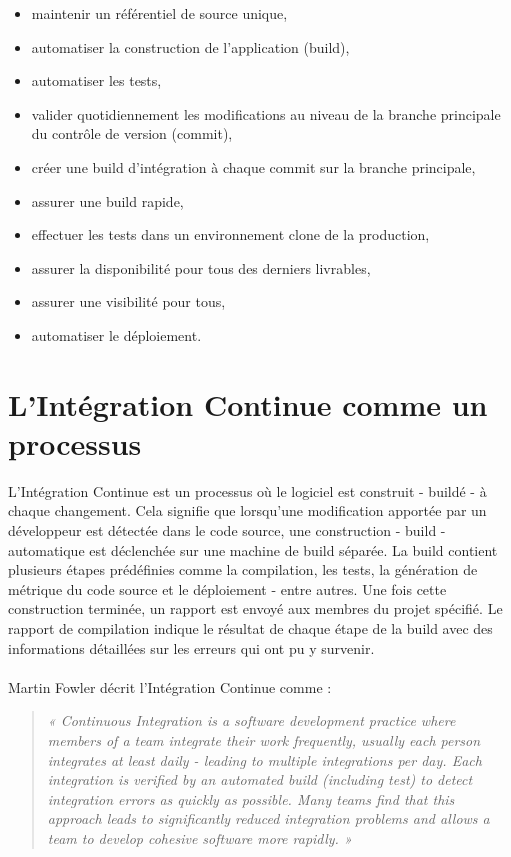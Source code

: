   \begin{itemize}
    \item maintenir un référentiel de source unique,
    \item automatiser la construction de l’application (build),
    \item automatiser les tests,
    \item valider quotidiennement les modifications au niveau de la branche principale du contrôle de version (commit),
    \item créer une build d’intégration à chaque commit sur la branche principale,
    \item assurer une build rapide,
    \item effectuer les tests dans un environnement clone de la production,
    \item assurer la disponibilité pour tous des derniers livrables,
    \item assurer une visibilité pour tous,
    \item automatiser le déploiement.\\
  \end{itemize}

  \section{L'Intégration Continue comme un processus}
  L’Intégration Continue est un processus où le logiciel est construit - buildé - à chaque changement. Cela signifie que lorsqu’une modification apportée par un développeur est détectée dans le code source, une construction - build - automatique est déclenchée sur une machine de build séparée. La build contient plusieurs étapes prédéfinies comme la compilation, les tests, la génération de métrique du code source et le déploiement - entre autres. Une fois cette construction terminée, un rapport est envoyé aux membres du projet spécifié. Le rapport de compilation indique le résultat de chaque étape de la build avec des informations détaillées sur les erreurs qui ont pu y survenir.\\\\

  Martin Fowler \cite{Fow00} décrit l’Intégration Continue comme :\\
  \begin{quotation}
    \emph{« Continuous Integration is a software development practice where members of a team integrate their work frequently, usually each person integrates at least daily - leading to multiple integrations per day. Each integration is verified by an automated build (including test) to detect integration errors as quickly as possible. Many teams find that this approach leads to significantly reduced integration problems and allows a team to develop cohesive software more rapidly. »}
  \end{quotation}


